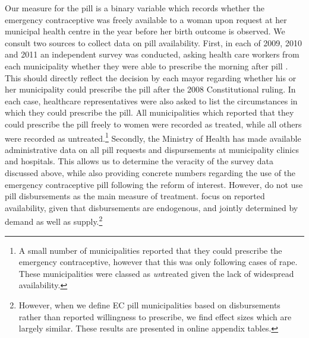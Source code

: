 
Our measure for the pill is a binary variable which records whether the 
emergency contraceptive was freely available to a woman upon request at her 
municipal health centre in the year before her birth outcome is observed.  We
consult two sources to collect data on pill availability.  First, in each of 
2009, 2010 and 2011 an independent survey was conducted, asking health care 
workers from each municipality whether they were able to prescribe the morning
after pill \citep{Didesetal2009,Didesetal2010,Didesetal2011}. This should 
directly reflect the decision by each mayor regarding whether his or her
municipality could prescribe the pill after the 2008 Constitutional ruling.  
In each case, healthcare representatives were also asked to list the circumstances 
in which they could prescribe the pill.  All municipalities which reported that
they could prescribe the pill freely to women were recorded as treated, while 
all others were recorded as untreated.\footnote{A small number of 
municipalities reported that they could prescribe the emergency contraceptive, 
however that this was only following cases of rape.  These municipalities were 
classed as \emph{un}treated given the lack of widespread availability.}  
Secondly, the Ministry of Health has made available administrative data on 
all pill requests and dispursements at municipality clinics and hospitals.  This
allows us to determine the veracity of the survey data discussed above, 
while also providing concrete numbers regarding the use of the emergency 
contraceptive pill following the reform of interest.  However, \person do not
use pill disbursements as the main measure of treatment.  \Person focus on
reported availability, given that disbursements are endogenous, and jointly
determined by demand as well as supply.\footnote{However, when we define EC
pill municipalities based on disbursements rather than reported willingness 
to prescribe, we find effect sizes which are largely similar.  These results
are presented in online appendix tables.}

